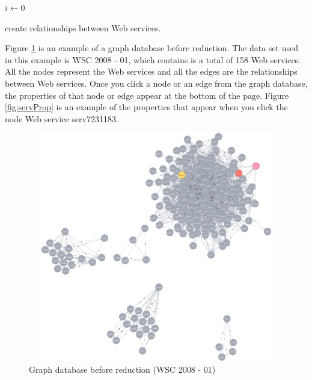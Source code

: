 \setlength{\textfloatsep}{20pt}%
\begin{algorithm}[H]
 \LinesNumbered
 \SetNlSty{}{}{:}
 $i \leftarrow 0$\;
 \caption{\footnotesize create relationships between Web services.}
\label{generation}
\end{algorithm}
\setlength{\textfloatsep}{20pt}%

Figure \ref{fig:beforeReduction} is an example of a graph database before reduction. The data set used in this example is WSC 2008 - 01, which contains is a total of 158 Web services. All the nodes represent the Web services and all the edges are the relationships between Web services. Once you click a node or an edge from the graph database, the properties of that node or edge appear at the bottom of the page. Figure \ref{fig:servProp} is an example of the properties that appear when you click the node Web service serv7231183. \par

\begin{figure}[h]
\includegraphics[width = 13cm, height = 10cm, scale = 0.5]{svg-before-reduce.pdf}
\centering
\caption{Graph database before reduction (WSC 2008 - 01)}
\label{fig:beforeReduction} 
\end{figure} 

